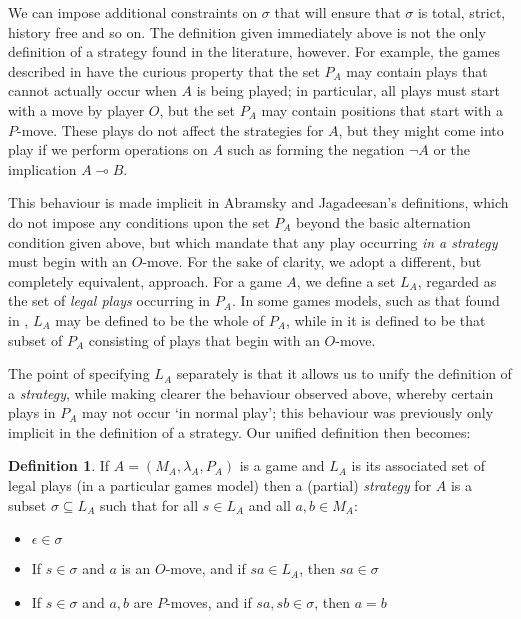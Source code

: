\documentclass[11pt]{article} %
\theoremstyle{plain} %
\theoremstyle{definition} %
\newtheorem{definition}[theorem]{Definition}
\theoremstyle{note}
\theoremstyle{exercisestyle}
\renewcommand{\implies}{\multimap}
\newcommand{\emptyplay}{\epsilon}
\renewcommand{\subset}{\subseteq}
\begin{document}
We can impose additional constraints on $\sigma$ that will ensure that $\sigma$ is total, strict, history free and so on.  The definition given immediately above is not the only definition of a strategy found in the literature, however.  For example, the games described in \cite{abramskyjagadeesangames} have the curious property that the set $P_A$ may contain plays that cannot actually occur when $A$ is being played; in particular, all plays must start with a move by player $O$, but the set $P_A$ may contain positions that start with a $P$-move.  These plays do not affect the strategies for $A$, but they might come into play if we perform operations on $A$ such as forming the negation $\neg A$ or the implication $A\implies B$.  

This behaviour is made implicit in Abramsky and Jagadeesan's definitions, which do not impose any conditions upon the set $P_A$ beyond the basic alternation condition given above, but which mandate that any play occurring \emph{in a strategy} must begin with an $O$-move.  For the sake of clarity, we adopt a different, but completely equivalent, approach.  For a game $A$, we define a set $L_A$, regarded as the set of \emph{legal plays} occurring in $P_A$.  In some games models, such as that found in \cite{blassgames}, $L_A$ may be defined to be the whole of $P_A$, while in \cite{abramskyjagadeesangames} it is defined to be that subset of $P_A$ consisting of plays that begin with an $O$-move.

The point of specifying $L_A$ separately is that it allows us to unify the definition of a \emph{strategy}, while making clearer the behaviour observed above, whereby certain plays in $P_A$ may not occur `in normal play'; this behaviour was previously only implicit in the definition of a strategy.  Our unified definition then becomes:

\begin{definition}
  If $A=(M_A,\lambda_A,P_A)$ is a game and $L_A$ is its associated set of legal plays (in a particular games model) then a (partial) \emph{strategy} for $A$ is a subset $\sigma\subset L_A$ such that for all $s\in L_A$ and all $a, b\in M_A$:
  \begin{itemize}
    \item $\emptyplay\in\sigma$
    \item If $s\in\sigma$ and $a$ is an $O$-move, and if $sa\in L_A$, then $sa\in\sigma$
    \item If $s\in\sigma$ and $a,b$ are $P$-moves, and if $sa,sb\in\sigma$, then $a=b$
  \end{itemize}
\end{definition}
\end{document}
